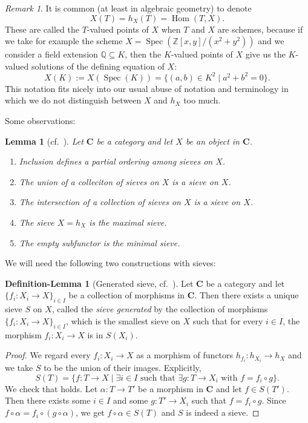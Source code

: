 \documentclass[12pt,reqno,a4paper]{amsart}
\theoremstyle{plain}
\newtheorem{lm}[thm]{Lemma}
\theoremstyle{definition}
\newtheorem{defnlm}[thm]{Definition-Lemma}
\theoremstyle{remark}
\newtheorem{rem}[thm]{Remark}
\begin{document}
\begin{rem}
  It is common (at least in algebraic geometry) to denote
  \[ X(T) = h_{X}(T) = \operatorname{Hom}(T,X). \]
  These are called the $T$-valued points of $X$ when $T$ and $X$ are schemes, because if we take for example the scheme $X = \operatorname{Spec}(\mathbb{Z}[x,y]/(x^{2} + y^{2}))$ and we consider a field extension $\mathbb{Q} \subseteq K$, then the $K$-valued points of $X$ give us the $K$-valued solutions of the defining equation of $X$:
  \[ X(K) := X(\operatorname{Spec}(K)) = \{ (a,b) \in K^{2} \mid a^{2} + b^{2} = 0\}. \]
  This notation fits nicely into our usual abuse of notation and terminology in which we do not distinguish between $X$ and $h_{X}$ too much.
\end{rem}

Some observations:

\begin{lm}[{cf.~\cite[\href{https://stacks.math.columbia.edu/tag/00YZ}{Tag 00YZ}]{stacks-project}}]
  Let $\mathbf{C}$ be a category and let $X$ be an object in $\mathbf{C}$.
  \begin{enumerate}
    \item Inclusion defines a partial ordering among sieves on $X$.
    \item The union of a colleciton of sieves on $X$ is a sieve on $X$.
    \item The intersection of a collection of sieves on $X$ is a sieve on $X$.
    \item The sieve $X = h_{X}$ is the maximal sieve.
    \item The empty subfunctor is the minimal sieve.
  \end{enumerate}
\end{lm}

We will need the following two constructions with sieves:

\begin{defnlm}[Generated sieve, {cf.~\cite[\href{https://stacks.math.columbia.edu/tag/00Z1}{Tag 00Z1}]{stacks-project}}]\label{defnlm:generated}
  Let $\mathbf{C}$ be a category and let $\{ f_{i} \colon X_{i} \to X \}_{i \in I}$ be a collection of morphisms in $\mathbf{C}$.
  Then there exists a unique sieve $S$ on $X$, called the \textit{sieve generated} by the collection of morphisms $\{ f_{i} \colon X_{i} \to X \}_{i \in I}$, which is the smallest sieve on $X$ such that for every $i \in I$, the morphism $f_{i} \colon X_{i} \to X$ is in $S(X_{i})$.
  \begin{proof}
    We regard every $f_{i} \colon X_{i} \to X$ as a morphism of functors $h_{f_{i}} \colon h_{X_{i}} \to h_{X}$ and we take $S$ to be the union of their images.
    Explicitly,
    \[ S(T) = \{ f \colon T \to X \mid \exists i \in I \text{ such that } \exists g \colon T \to X_{i} \text{ with } f = f_{i} \circ g \}. \]
    We check that  holds.
    Let $\alpha \colon T \to T'$ be a morphism in $\mathbf{C}$ and let $f \in S(T')$.
    Then there exists some $i \in I$ and some $g \colon T' \to X_{i}$ such that $f = f_{i} \circ g$.
    Since $f \circ \alpha = f_{i} \circ (g \circ \alpha)$, we get $f \circ \alpha \in S(T)$ and $S$ is indeed a sieve.
  \end{proof}
\end{defnlm}
\end{document}
